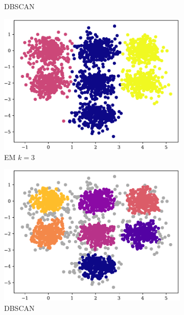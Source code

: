 \begin{figure}[t!]
\begin{subfigure}[b]{0.45\textwidth}
        \caption{DBSCAN}
        \label{subfig:4-4-dbscan}
    \end{subfigure}
    \begin{subfigure}[b]{0.45\textwidth}
        \includegraphics[width=\textwidth]{../plots/7-3_pred_em.pdf}
        \caption{EM $k = 3$}
        \label{subfig:7-3-em}
    \end{subfigure}
    \hspace{0.09\textwidth}
    \begin{subfigure}[b]{0.45\textwidth}
        \includegraphics[width=\textwidth]{../plots/7-3_pred_dbscan.pdf}
        \caption{DBSCAN}
        \label{subfig:7-3-dbscan}
    \end{subfigure}
    \begin{subfigure}[b]{0.45\textwidth}

\end{subfigure}
\end{figure}
